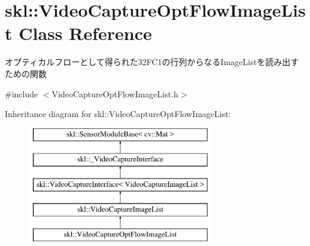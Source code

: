 \hypertarget{classskl_1_1_video_capture_opt_flow_image_list}{}\section{skl\+:\+:Video\+Capture\+Opt\+Flow\+Image\+List Class Reference}
\label{classskl_1_1_video_capture_opt_flow_image_list}


オプティカルフローとして得られた32\+F\+C1の行列からなる\+Image\+Listを読み出すための関数  




{\ttfamily \#include $<$Video\+Capture\+Opt\+Flow\+Image\+List.\+h$>$}

Inheritance diagram for skl\+:\+:Video\+Capture\+Opt\+Flow\+Image\+List\+:\begin{figure}[H]
\begin{center}
\leavevmode
\includegraphics[height=5.000000cm]{classskl_1_1_video_capture_opt_flow_image_list}
\end{center}
\end{figure}
